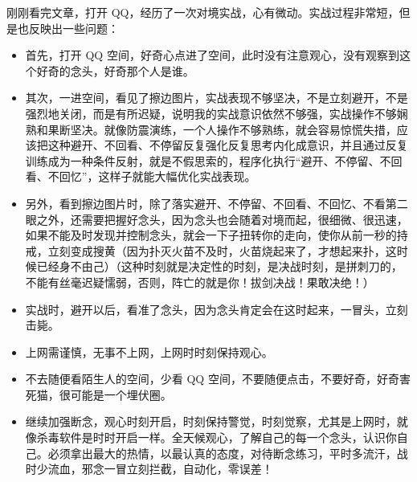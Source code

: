 \begin{case}[实战水平提升的过程]
    刚刚看完文章，打开 QQ，经历了一次对境实战，心有微动。实战过程非常短，但是也反映出一些问题：\begin{multicols}{2}
        \begin{itemize}
            \item 首先，打开 QQ 空间，好奇心点进了空间，此时没有注意观心，没有观察到这个好奇的念头，好奇那个人是谁。
            \item 其次，一进空间，看见了擦边图片，实战表现不够坚决，不是立刻避开，不是强烈地关闭，而是有所迟疑，说明我的实战意识依然不够强，实战操作不够娴熟和果断坚决。就像防震演练，一个人操作不够熟练，就会容易惊慌失措，应该把这种避开、不回看、不停留反复强化反复思考内化成意识，并且通过反复训练成为一种条件反射，就是不假思索的，程序化执行“避开、不停留、不回看、不回忆”，这样子就能大幅优化实战表现。
            \item 另外，看到擦边图片时，除了落实避开、不停留、不回看、不回忆、不看第二眼之外，还需要把握好念头，因为念头也会随着对境而起，很细微、很迅速，如果不能及时发现并控制念头，就会一下子扭转你的走向，使你从前一秒的持戒，立刻变成搜黄（因为扑灭火苗不及时，火苗烧起来了，才想起来扑，这时候已经身不由己）（这种时刻就是决定性的时刻，是决战时刻，是拼刺刀的，不能有丝毫迟疑懦弱，否则，阵亡的就是你！拔剑决战！果敢决绝！）
            \item 实战时，避开以后，看准了念头，因为念头肯定会在这时起来，一冒头，立刻击毙。
            \item 上网需谨慎，无事不上网，上网时时刻保持观心。
            \item 不去随便看陌生人的空间，少看 QQ 空间，不要随便点击，不要好奇，好奇害死猫，很可能是一个埋伏圈。
            \item 继续加强断念，观心时刻开启，时刻保持警觉，时刻觉察，尤其是上网时，就像杀毒软件是时时开启一样。全天候观心，了解自己的每一个念头，认识你自己。必须拿出最大的热情，以最认真的态度，对待断念练习，平时多流汗，战时少流血，邪念一冒立刻拦截，自动化，零误差！
        \end{itemize}
    \end{multicols}

\end{case}
